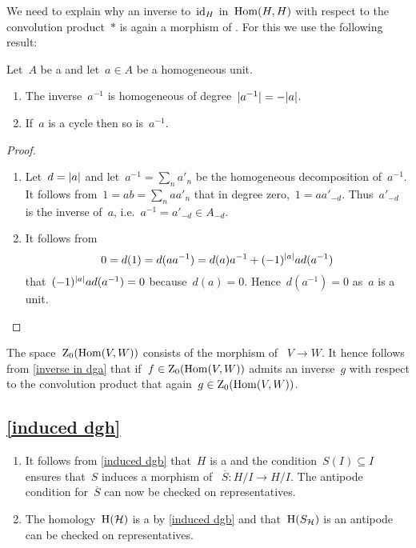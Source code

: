 We need to explain why an inverse to~$\operatorname{id}_H$ in~$\operatorname{Hom}(H,H)$ with respect to the convolution product~$*$ is again a  morphism of {\dgvs}.
For this we use the following result:

\begin{lemma}
  \label{inverse in dga}
  Let~$A$ be a {\dga} and let~$a \in A$ be a homogeneous unit.
  \begin{enumerate}
    \item
      The inverse~$a^{-1}$ is homogeneous of degree~$\lvert a^{-1}\rvert = - \lvert a\rvert$.
    \item
      If~$a$ is a cycle then so is~$a^{-1}$.
  \end{enumerate}
\end{lemma}

\begin{proof}
  \leavevmode
  \begin{enumerate}
    \item
      Let~$d = \lvert a\rvert$ and let~$a^{-1} = \sum_n a'_n$ be the homogeneous decomposition of~$a^{-1}$.
      It follows from~$1 = ab = \sum_n a a'_n$ that in degree zero,~$1 = a a'_{-d}$.
      Thus~$a'_{-d}$ is the inverse of~$a$, i.e.~$a^{-1} = a'_{-d} \in A_{-d}$.
    \item
      It follows from
      \[
        0
        =
        d(1)
        =
        d(a a^{-1})
        =
        d(a) a^{-1}
        +
        (-1)^{\lvert a\rvert} a d(a^{-1})
      \]
      that~$(-1)^{\lvert a\rvert} a d(a^{-1}) = 0$ because~$d(a) = 0$.
      Hence~$d(a^{-1}) = 0$ as~$a$ is a unit.
    \qedhere
  \end{enumerate}
\end{proof}

The space~$\operatorname{Z}_0(\operatorname{Hom}(V,W))$ consists of the morphism of {\dgvs}~$V \to W$.
It hence follows from \cref{inverse in dga} that if~$f \in \operatorname{Z}_0(\operatorname{Hom}(V,W))$ admits an inverse~$g$ with respect to the convolution product that again~$g \in \operatorname{Z}_0(\operatorname{Hom}(V,W))$.



\subsection{\cref{induced dgh}}
\label{induced dgh proof}
\begin{enumerate}
  \item
    It follows from \cref{induced dgb} that~$H$ is a {\dgb} and the condition~$S(I) \subseteq I$ ensures that~$S$ induces a morphism of {\dgvs}~$\overline{S} \colon H/I \to H/I$.
    The antipode condition for~$\overline{S}$ can now be checked on representatives.
  \item
    The homology~$\operatorname{H}(\mathcal{H})$ is a {\dgb} by \cref{induced dgb} and that~$\operatorname{H}(S_{\mathcal{H}})$ is an antipode can be checked on representatives.
\end{enumerate}



